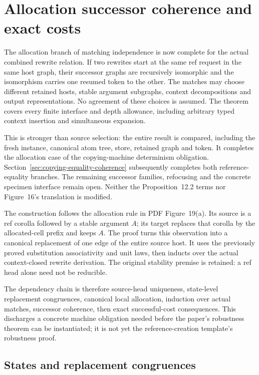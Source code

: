 \clearpage
\section{Allocation successor coherence and exact costs}
\label{sec:copying-allocation-coherence}
The allocation branch of matching independence is now complete for the actual
combined rewrite relation. If two rewrites start at the same ref request in
the same host graph, their successor graphs are recursively isomorphic and
the isomorphism carries one resumed token to the other. The matches may choose
different retained hosts, stable argument subgraphs, context decompositions
and output representations. No agreement of these choices is assumed.
The theorem covers every finite interface and depth allowance, including
arbitrary typed context insertion and simultaneous expansion.

This is stronger than source selection: the entire result is compared,
including the fresh instance, canonical atom tree, store, retained graph and
token. It completes the allocation case of the copying-machine determinism
obligation. Section~\ref{sec:copying-equality-coherence} subsequently completes
both reference-equality branches. The remaining successor families,
refocusing and the concrete specimen interface remain open. Neither the
Proposition~12.2 terms nor Figure~16's translation is modified.

The construction follows the allocation rule in PDF Figure~19(a). Its source
is a ref corolla followed by a stable argument $A$; its target replaces that
corolla by the allocated-cell prefix and keeps $A$. The proof turns this
observation into a canonical replacement of one edge of the entire source
host. It uses the previously proved substitution associativity and unit laws,
then inducts over the actual context-closed rewrite derivation. The original
stability premise is retained: a ref head alone need not be reducible.

The dependency chain is therefore source-head uniqueness, state-level
replacement congruences, canonical local allocation, induction over actual
matches, successor coherence, then exact successful-cost consequences.
This discharges a concrete machine obligation needed before the paper's
robustness theorem can be instantiated; it is not yet the reference-creation
template's robustness proof.

\subsection{States and replacement congruences}

